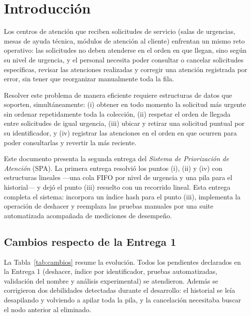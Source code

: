 \section{Introducción}
\label{sec:introduccion}

Los centros de atención que reciben solicitudes de servicio (salas de
urgencias, mesas de ayuda técnica, módulos de atención al cliente) enfrentan
un mismo reto operativo: las solicitudes no deben atenderse en el orden en
que llegan, sino según su nivel de urgencia, y el personal necesita poder
consultar o cancelar solicitudes específicas, revisar las atenciones
realizadas y corregir una atención registrada por error, sin tener que
reorganizar manualmente toda la fila.

Resolver este problema de manera eficiente requiere estructuras de datos que
soporten, simultáneamente: (i) obtener en todo momento la solicitud más
urgente sin ordenar repetidamente toda la colección, (ii) respetar el orden
de llegada entre solicitudes de igual urgencia, (iii) ubicar y retirar una
solicitud puntual por su identificador, y (iv) registrar las atenciones en
el orden en que ocurren para poder consultarlas y revertir la más reciente.

Este documento presenta la segunda entrega del \emph{Sistema de Priorización
de Atención} (SPA). La primera entrega resolvió los puntos (i), (ii) y (iv)
con estructuras lineales ---una cola FIFO por nivel de urgencia y una pila
para el historial--- y dejó el punto (iii) resuelto con un recorrido lineal.
Esta entrega completa el sistema: incorpora un índice hash para el punto
(iii), implementa la operación de deshacer y reemplaza las pruebas manuales
por una suite automatizada acompañada de mediciones de desempeño.

\subsection{Cambios respecto de la Entrega 1}
\label{sec:cambios}

La Tabla~\ref{tab:cambios} resume la evolución. Todos los pendientes
declarados en la Entrega 1 (deshacer, índice por identificador, pruebas
automatizadas, validación del nombre y análisis experimental) se
atendieron. Además se corrigieron dos debilidades detectadas durante el
desarrollo: el historial se leía desapilando y volviendo a apilar toda la
pila, y la cancelación necesitaba buscar el nodo anterior al eliminado.

